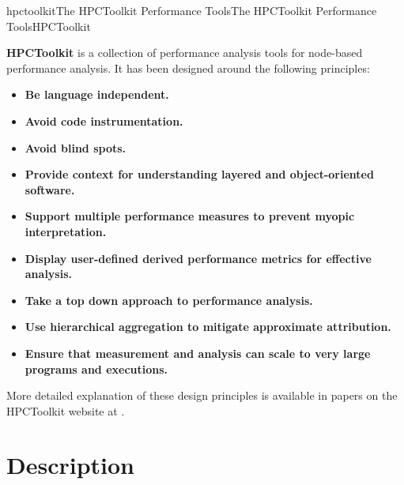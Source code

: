 \documentclass[english]{article}
\begin{document}
\begin{Name}{1}{hpctoolkit}{The HPCToolkit Performance Tools}{The HPCToolkit Performance Tools}{HPCToolkit}

\textbf{HPCToolkit} is a collection of performance analysis tools for node-based performance analysis.
It has been designed around the following principles:
\begin{itemize}

\item \textbf{Be language independent.}
\item \textbf{Avoid code instrumentation.}
\item \textbf{Avoid blind spots.}
\item \textbf{Provide context for understanding layered and object-oriented software.}
\item \textbf{Support multiple performance measures to prevent myopic interpretation.}
\item \textbf{Display user-defined derived performance metrics for effective analysis.}
\item \textbf{Take a top down approach to performance analysis.}
\item \textbf{Use hierarchical aggregation to mitigate approximate attribution.} 
\item \textbf{Ensure that measurement and analysis can scale to very large programs and executions.}

\end{itemize}

More detailed explanation of these design principles is available
in papers on the HPCToolkit website at .

\end{Name}

\section{Description}
\end{document}
